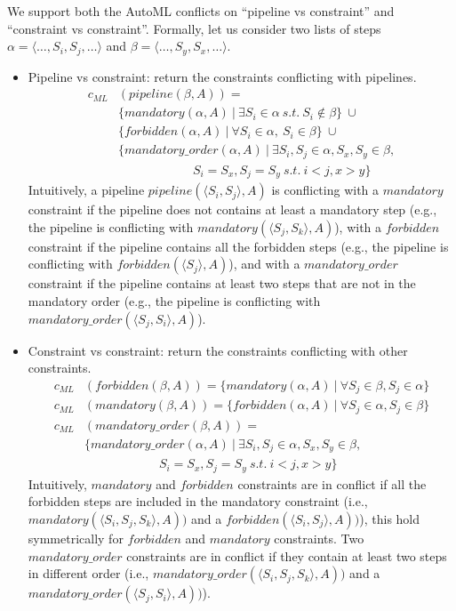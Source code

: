 We support both the AutoML conflicts on ``pipeline vs constraint'' and ``constraint vs constraint''. 
Formally, let us consider two lists of steps $\alpha = \langle \ldots, S_i, S_j, \ldots \rangle$ and $\beta = \langle \ldots, S_y, S_x, \ldots \rangle$.
\begin{itemize}
    \item Pipeline vs constraint: return the constraints conflicting with pipelines.
    \begin{align*}
    c_{ML}&(pipeline(\beta, A)) = \\
        &\{mandatory(\alpha, A)~|~\exists S_i \in \alpha~s.t.~S_i \notin \beta\}~\cup \\
        &\{forbidden(\alpha, A)~|~\forall S_i \in \alpha,~S_i \in \beta \}~\cup\\
        &\{mandatory\_order(\alpha, A)~|~\exists S_i, S_j \in \alpha, S_x, S_y \in \beta, \\&\qquad\qquad\qquad S_i = S_x, S_j = S_y~s.t.~i < j, x > y\}
    \end{align*}
    Intuitively, a pipeline $pipeline(\langle S_i, S_j \rangle, A)$ is conflicting with a $mandatory$ constraint if the pipeline does not contains at least a mandatory step (e.g., the pipeline is conflicting with $mandatory(\langle S_j, S_k \rangle, A)$), with a $forbidden$ constraint if the pipeline contains all the forbidden steps (e.g., the pipeline is conflicting with $forbidden(\langle S_j \rangle, A)$), and with a $mandatory\_order$ constraint if the pipeline contains at least two steps that are not in the mandatory order (e.g., the pipeline is conflicting with $mandatory\_order(\langle S_j, S_i \rangle, A)$).
    \item Constraint vs constraint: return the constraints conflicting with other constraints.
    \begin{align*}
        c_{ML}&(forbidden(\beta, A)) = \{mandatory(\alpha, A)~|~\forall S_j \in \beta, S_j \in \alpha\}\\
        c_{ML}&(mandatory(\beta, A)) = \{forbidden(\alpha, A)~|~\forall S_j \in \alpha, S_j \in \beta\}\\
        c_{ML}&(mandatory\_order(\beta, A)) = \\
        &\{mandatory\_order(\alpha, A)~|~\exists S_i, S_j \in \alpha, S_x, S_y \in \beta, \\&\qquad\qquad\qquad S_i = S_x, S_j = S_y~s.t.~i < j, x > y\}
    \end{align*}
    Intuitively, $mandatory$ and $forbidden$ constraints are in conflict if all the forbidden steps are included in the mandatory constraint (i.e.,  $mandatory(\langle S_i, S_j, S_k \rangle, A))$ and a $forbidden(\langle S_i, S_j \rangle, A))$), this hold symmetrically for $forbidden$ and $mandatory$ constraints. Two $mandatory\_order$ constraints are in conflict if they contain at least two steps in different order (i.e.,  $mandatory\_order(\langle S_i, S_j, S_k \rangle, A))$ and a $mandatory\_order(\langle S_j, S_i \rangle, A))$).
\end{itemize}


